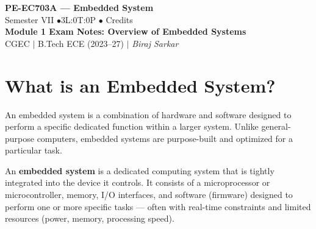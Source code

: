 \documentclass[12pt,a4paper]{article}
\begin{document}

\begin{center}
  {\LARGE\bfseries\color{myred} PE-EC703A --- Embedded System}\\[5pt]
  {\normalsize\color{mydark} Semester VII \quad$\bullet$\quad 3L:0T:0P \quad$\bullet$ Credits}\\[3pt]
  {\normalsize\color{myteal}\textbf{Module 1 Exam Notes: Overview of Embedded Systems}}\\[3pt]
  {\small\color{mydark} CGEC \;$|$\; B.Tech ECE (2023--27) \;$|$\; \textit{Biraj Sarkar}}
\end{center}
\vspace{2pt}
\noindent{\color{myred}\rule{\linewidth}{1.5pt}}
\vspace{2pt}

\hypersetup{linkcolor=mydark}
\tableofcontents
\hypersetup{linkcolor=myteal}
\newpage

\section{What is an Embedded System?}

An embedded system is a combination of hardware and software designed to perform a specific dedicated function within a larger system. Unlike general-purpose computers, embedded systems are purpose-built and optimized for a particular task.

\begin{tcolorbox}[defbox, title={\textbf{Embedded System --- Definition}}]
An \textbf{embedded system} is a dedicated computing system that is tightly integrated into the device it controls. It consists of a microprocessor or microcontroller, memory, I/O interfaces, and software (firmware) designed to perform one or more specific tasks --- often with real-time constraints and limited resources (power, memory, processing speed).
\end{tcolorbox}
\end{document}
